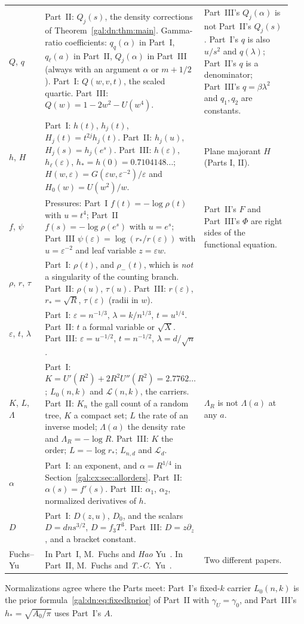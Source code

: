 \documentclass[11pt,letterpaper]{article}
\numberwithin{equation}{section}
\theoremstyle{definition}\newtheorem{definition}[theorem]{Definition}
\theoremstyle{remark}\newtheorem{remark}[theorem]{Remark}
\newcommand{\eps}{\varepsilon}
\begin{document}
{\begin{longtable}{@{}>{\raggedright\arraybackslash}p{0.13\linewidth}>{\raggedright\arraybackslash}p{0.47\linewidth}>{\raggedright\arraybackslash}p{0.34\linewidth}@{}}
$Q$, $q$ & Part~II: $Q_j(s)$, the density corrections of Theorem~\ref{gal:dn:thm:main}. Gamma-ratio coefficients: $q_q(\alpha)$ in Part~I, $q_\ell(a)$ in Part~II, $Q_j(\alpha)$ in Part~III (always with an argument $\alpha$ or $m+1/2$). Part~I: $Q(w,v,t)$, the scaled quartic. Part~III: $Q(w)=1-2w^2-U(w^4)$. & Part~III's $Q_j(\alpha)$ is not Part~II's $Q_j(s)$. Part~I's $q$ is also $u/s^2$ and $q(\lambda)$; Part~II's $q$ is a denominator; Part~III's $q=\beta\lambda^2$ and $q_1,q_2$ are constants.\\
$h$, $H$ & Part~I: $h(t)$, $h_j(t)$, $H_j(t)=t^{2j}h_j(t)$. Part~II: $h_j(u)$, $H_j(s)=h_j(e^s)$. Part~III: $h(\eps)$, $h_\ell(\eps)$, $h_*=h(0)=0.7104148\ldots$; $H(w,\eps)=G(\eps w,\eps^{-2})/\eps$ and $H_0(w)=U(w^2)/w$. & Plane majorant $H$ (Parts I, II).\\
$f$, $\psi$ & Pressures: Part~I $f(t)=-\log\rho(t)$ with $u=t^4$; Part~II $f(s)=-\log\rho(e^s)$ with $u=e^s$; Part~III $\psi(\eps)=\log(r_*/r(\eps))$ with $u=\eps^{-2}$ and leaf variable $z=\eps w$. & Part~II's $F$ and Part~III's $\Phi$ are right sides of the functional equation.\\
$\rho$, $r$, $\tau$ & Part~I: $\rho(t)$, and $\rho_-(t)$, which is \emph{not} a singularity of the counting branch. Part~II: $\rho(u)$, $\tau(u)$. Part~III: $r(\eps)$, $r_*=\sqrt R$, $\tau(\eps)$ (radii in $w$). & \\
$\eps$, $t$, $\lambda$ & Part~I: $\eps=n^{-1/3}$, $\lambda=k/n^{1/3}$, $t=u^{1/4}$. Part~II: $t$ a formal variable or $\sqrt X$. Part~III: $\eps=u^{-1/2}$, $t=n^{-1/2}$, $\lambda=d/\sqrt n$. & \\
$K$, $L$, $\Lambda$ & Part~I: $K=U'(R^2)+2R^2U''(R^2)=2.7762\ldots$; $L_0(n,k)$ and $\mathcal L(n,k)$, the carriers. Part~II: $K_n$ the gall count of a random tree, $K$ a compact set; $L$ the rate of an inverse model; $\Lambda(a)$ the density rate and $\Lambda_R=-\log R$. Part~III: $K$ the order; $L=-\log r_*$; $L_{n,d}$ and $\mathcal L_d$. & $\Lambda_R$ is not $\Lambda(a)$ at any $a$.\\
$\alpha$ & Part~I: an exponent, and $\alpha=R^{1/4}$ in Section~\ref{gal:cx:sec:allorders}. Part~II: $\alpha(s)=f'(s)$. Part~III: $\alpha_1$, $\alpha_2$, normalized derivatives of $h$. & \\
$D$ & Part~I: $D(z,u)$, $D_0$, and the scalars $D=dns^{3/2}$, $D=f_3T^3$. Part~III: $D=z\partial_z$, and a bracket constant. & \\
Fuchs--Yu & In Part~I, M.~Fuchs and \emph{Hao} Yu~\cite{fuchs-yu}. In Part~II, M.~Fuchs and \emph{T.-C.}~Yu~\cite{semisimplex}. & Two different papers.\\
\end{longtable}
\addtocounter{table}{-1}
}
Normalizations agree where the Parts meet: Part~I's fixed-$k$ carrier $L_0(n,k)$ is the prior formula~\eqref{gal:dn:eq:fixedkprior} of Part~II with $\gamma_U=\gamma_0$, and Part~III's $h_*=\sqrt{A_0/\pi}$ uses Part~I's $A$.
\end{document}
